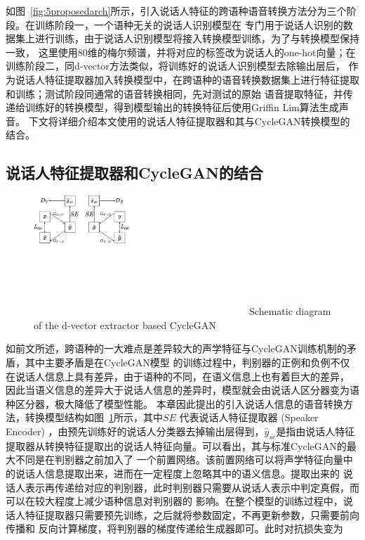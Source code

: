 如图~\ref{fig:5proposedarch}所示，引入说话人特征的跨语种语音转换方法分为三个阶段。在训练阶段一，一个语种无关的说话人识别模型在
专门用于说话人识别的数据集上进行训练，由于说话人识别模型将接入转换模型训练，为了与转换模型保持一致，
这里使用80维的梅尔频谱，并将对应的标签改为说话人的one-hot向量；在训练阶段二，同d-vector方法类似，将训练好的说话人识别模型去除输出层后，
作为说话人特征提取器加入转换模型中，在跨语种的语音转换数据集上进行特征提取和训练；测试阶段同通常的语音转换相同，先对测试的原始
语音提取特征，并传递给训练好的转换模型，得到模型输出的转换特征后使用Griffin Lim算法生成声音。
下文将详细介绍本文使用的说话人特征提取器和其与CycleGAN转换模型的结合。



\subsection{说话人特征提取器和CycleGAN的结合}

\begin{figure}[!htp]
    \centering
    \includegraphics[width=8cm,trim=0 230 370 0,clip]{figure/5_dvectorcyclegan.pdf}
    {Schematic diagram of the d-vector extractor based CycleGAN}
    \label{fig:dvectorcyclegan}
\end{figure}

如前文所述，跨语种的一大难点是差异较大的声学特征与CycleGAN训练机制的矛盾，其中主要矛盾是在CycleGAN模型
的训练过程中，判别器的正例和负例不仅在说话人信息上具有差异，由于语种的不同，在语义信息上也有着巨大的差异，
因此当语义信息的差异大于说话人信息的差异时，模型就会由说话人区分器变为语种区分器，极大降低了模型性能。
本章因此提出的引入说话人信息的语音转换方法，转换模型结构如图~\ref{fig:dvectorcyclegan}所示，其中$SE$
代表说话人特征提取器 (Speaker Encoder) ，由预先训练好的说话人分类器去掉输出层得到，$\hat{y}_{se}$是指由说话人特征
提取器从转换特征提取出的说话人特征向量。可以看出，其与标准CycleGAN的最大不同是在判别器之前加入了
一个前置网络。该前置网络可以将声学特征向量中的说话人信息提取出来，进而在一定程度上忽略其中的语义信息。提取出来的
说话人表示再传递给对应的判别器，此时判别器只需要从说话人表示中判定真假，而可以在较大程度上减少语种信息对判别器的
影响。在整个模型的训练过程中，说话人特征提取器只需要预先训练，之后就将参数固定，不再更新参数，只需要前向传播和
反向计算梯度，将判别器的梯度传递给生成器即可。此时对抗损失变为

